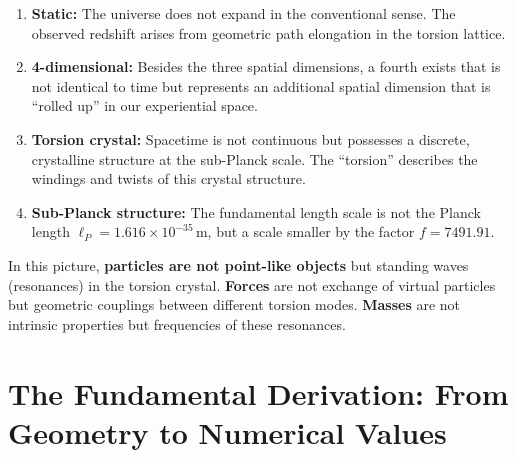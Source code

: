 	\begin{enumerate}
		\item \textbf{Static:} The universe does not expand in the conventional sense. The observed redshift arises from geometric path elongation in the torsion lattice.
		\item \textbf{4-dimensional:} Besides the three spatial dimensions, a fourth exists that is not identical to time but represents an additional spatial dimension that is \enquote{rolled up} in our experiential space.
		\item \textbf{Torsion crystal:} Spacetime is not continuous but possesses a discrete, crystalline structure at the sub-Planck scale. The \enquote{torsion} describes the windings and twists of this crystal structure.
		\item \textbf{Sub-Planck structure:} The fundamental length scale is not the Planck length \(\ell_P = 1.616 \times 10^{-35}\,\text{m}\), but a scale smaller by the factor \(f = 7491.91\).
	\end{enumerate}
	
	In this picture, \textbf{particles are not point-like objects} but standing waves (resonances) in the torsion crystal. \textbf{Forces} are not exchange of virtual particles but geometric couplings between different torsion modes. \textbf{Masses} are not intrinsic properties but frequencies of these resonances.
	
	\section{The Fundamental Derivation: From Geometry to Numerical Values}
